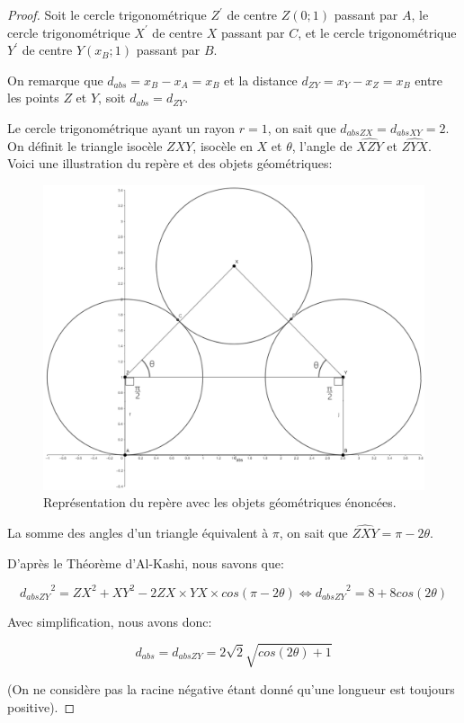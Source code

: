 \documentclass{amsart}
\theoremstyle{definition}
\theoremstyle{remark}
\numberwithin{equation}{section}
\begin{document}
\begin{proof}
  Soit le cercle trigonométrique $Z^\prime$ de centre $Z(0;1)$ passant par $A$, le cercle trigonométrique $X^\prime$ de centre $X$ passant par $C$, et le cercle trigonométrique $Y^\prime$ de centre $Y(x_B;1)$ passant par $B$. 

  On remarque que $d_{abs}=x_B-x_A=x_B$ et la distance $d_{ZY}=x_Y-x_Z=x_B$ entre les points $Z$ et $Y$, soit $d_{abs}=d_{ZY}$.

  Le cercle trigonométrique ayant un rayon $r=1$, on sait que $d_{abs ZX}=d_{abs XY}=2$. On définit le triangle isocèle $ZXY$, isocèle en $X$ et $\theta$, l'angle de $\widehat{XZY}$ et $\widehat{ZYX}$. Voici une illustration du repère et des objets géométriques:

  \begin{figure}[H]
    \centering
    \includegraphics[scale=0.2]{three_circles.png}
    \caption{Représentation du repère avec les objets géométriques énoncées.}
  \end{figure}

  La somme des angles d'un triangle équivalent à $\pi$, on sait que $\widehat{ZXY}=\pi-2\theta$.

  D'après le Théorème d'Al-Kashi, nous savons que: 

  \[{d_{abs ZY}}^2=ZX^2+XY^2-2ZX\times YX\times cos(\pi-2\theta) \Leftrightarrow {d_{abs ZY}}^2=8+8cos(2\theta)\]

  Avec simplification, nous avons donc:

  \[d_{abs}={d_{abs ZY}}=2\sqrt{2}\sqrt{cos(2\theta)+1}\]

  (On ne considère pas la racine négative étant donné qu'une longueur est toujours positive).


\end{proof}
\end{document}
